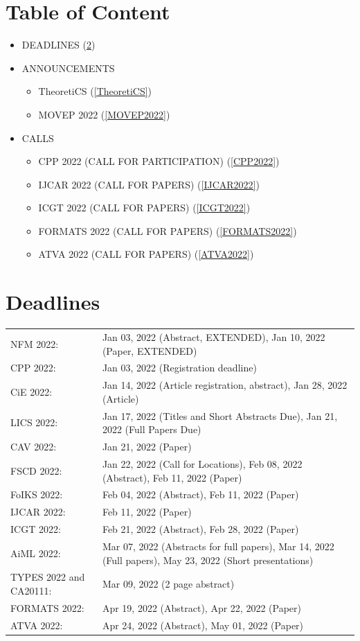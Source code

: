 \documentclass[prodmode,acmtecs]{acmsmall} %
\begin{document}
\section{Table of Content}\begin{itemize}\item DEADLINES (\cref{deadlines}) 
 
\item ANNOUNCEMENTS 
 
\begin{itemize}\item TheoretiCS (\cref{TheoretiCS})
\item MOVEP 2022 (\cref{MOVEP2022})
\end{itemize} 
\item CALLS 
 
\begin{itemize}\item CPP 2022 (CALL FOR PARTICIPATION) (\cref{CPP2022})
\item IJCAR 2022 (CALL FOR PAPERS) (\cref{IJCAR2022})
\item ICGT 2022 (CALL FOR PAPERS) (\cref{ICGT2022})
\item FORMATS 2022 (CALL FOR PAPERS) (\cref{FORMATS2022})
\item ATVA 2022 (CALL FOR PAPERS) (\cref{ATVA2022})
\end{itemize} 
\end{itemize}\section{Deadlines}\label{deadlines}\begin{tabulary}{\linewidth}{LL}NFM 2022:  & Jan 03, 2022 (Abstract, EXTENDED), Jan 10, 2022 (Paper, EXTENDED) \\
CPP 2022:  & Jan 03, 2022 (Registration deadline) \\
CiE 2022:  & Jan 14, 2022 (Article registration, abstract), Jan 28, 2022 (Article) \\
LICS 2022:  & Jan 17, 2022 (Titles and Short Abstracts Due), Jan 21, 2022 (Full Papers Due) \\
CAV 2022:  & Jan 21, 2022 (Paper) \\
FSCD 2022:  & Jan 22, 2022 (Call for Locations), Feb 08, 2022 (Abstract), Feb 11, 2022 (Paper) \\
FoIKS 2022:  & Feb 04, 2022 (Abstract), Feb 11, 2022 (Paper) \\
IJCAR 2022:  & Feb 11, 2022 (Paper) \\
ICGT 2022:  & Feb 21, 2022 (Abstract), Feb 28, 2022 (Paper) \\
AiML 2022:  & Mar 07, 2022 (Abstracts for full papers), Mar 14, 2022 (Full papers), May 23, 2022 (Short presentations) \\
TYPES 2022 and CA20111:  & Mar 09, 2022 (2 page abstract) \\
FORMATS 2022:  & Apr 19, 2022 (Abstract), Apr 22, 2022 (Paper) \\
ATVA 2022:  & Apr 24, 2022 (Abstract), May 01, 2022 (Paper) \\
\end{tabulary}
\end{document}
